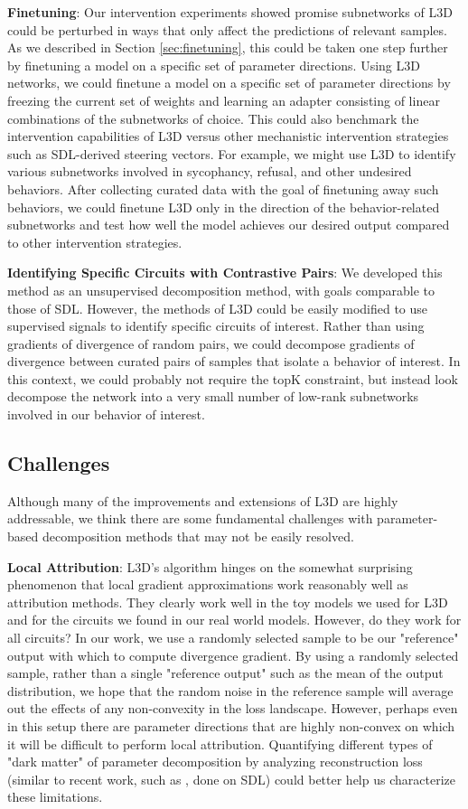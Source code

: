 \documentclass{article}
\theoremstyle{plain}
\theoremstyle{definition}
\theoremstyle{remark}
\begin{document}
\textbf{Finetuning}: Our intervention experiments showed promise subnetworks of L3D could be perturbed in ways that only affect the predictions of relevant samples. As we described in Section \ref{sec:finetuning}, this could be taken one step further by finetuning a model on a specific set of parameter directions. Using L3D networks, we could finetune a model on a specific set of parameter directions by freezing the current set of weights and learning an adapter consisting of linear combinations of the subnetworks of choice. This could also benchmark the intervention capabilities of L3D versus other mechanistic intervention strategies such as SDL-derived steering vectors. For example, we might use L3D to identify various subnetworks involved in sycophancy, refusal, and other undesired behaviors. After collecting curated data with the goal of finetuning away such behaviors, we could finetune L3D only in the direction of the behavior-related subnetworks and test how well the model achieves our desired output compared to other intervention strategies. 

\textbf{Identifying Specific Circuits with Contrastive Pairs}:
We developed this method as an unsupervised decomposition method, with goals comparable to those of SDL. However, the methods of L3D could be easily modified to use supervised signals to identify specific circuits of interest. Rather than using gradients of divergence of random pairs, we could decompose gradients of divergence between curated pairs of samples that isolate a behavior of interest. In this context, we could probably not require the topK constraint, but instead look decompose the network into a very small number of low-rank subnetworks involved in our behavior of interest. 

\subsection{Challenges}
Although many of the improvements and extensions of L3D are highly addressable, we think there are some fundamental challenges with parameter-based decomposition methods that may not be easily resolved.


\textbf{Local Attribution}: L3D's algorithm hinges on the somewhat surprising phenomenon that local gradient approximations work reasonably well as attribution methods. They clearly work well in the toy models we used for L3D and for the circuits we found in our real world models. However, do they work for all circuits? In our work, we use a randomly selected sample to be our "reference" output with which to compute divergence gradient. By using a randomly selected sample, rather than a single "reference output" such as the mean of the output distribution, we hope that the random noise in the reference sample will average out the effects of any non-convexity in the loss landscape.  However, perhaps even in this setup there are parameter directions that are highly non-convex on which it will be difficult to perform local attribution. Quantifying different types of "dark matter" of parameter decomposition by analyzing reconstruction loss (similar to recent work, such as \cite{engels2024decomposing}, done on SDL) could better help us characterize these limitations.
\end{document}
